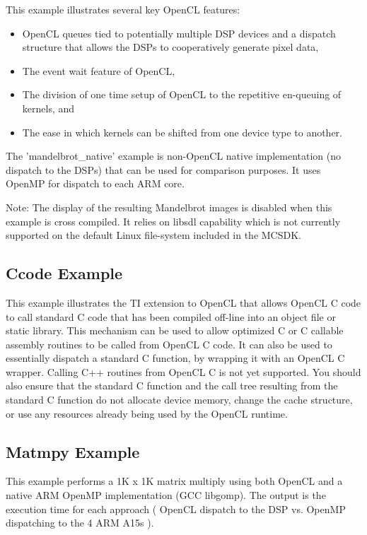 \documentclass[10pt]{article}
\begin{document}
This example illustrates several key OpenCL features:
\begin{itemize}
\item OpenCL queues tied to potentially multiple DSP devices and a 
     dispatch structure that allows the DSPs to cooperatively generate pixel 
     data,
\item The event wait feature of OpenCL,
\item The division of one time setup of OpenCL to the repetitive
     en-queuing of kernels, and
\item The ease in which kernels can be shifted from one device type to another.
\end{itemize}
   

The 'mandelbrot\_native' example is non-OpenCL native implementation (no 
dispatch to the DSPs) that can be used for comparison purposes. It uses OpenMP
for dispatch to each ARM core.

Note: The display of the resulting Mandelbrot images is disabled when this example is cross compiled.  It relies on libsdl capability which is not currently supported on the default Linux file-system included in the MCSDK. 


\subsection{Ccode Example}\label{ccode}
This example illustrates the TI extension to OpenCL that allows OpenCL C code
to call standard C code that has been compiled off-line into an object file or
static library. This mechanism can be used to allow optimized C or C callable
assembly routines to be called from OpenCL C code.  It can also be used to
essentially dispatch a standard C function, by wrapping it with an OpenCL C 
wrapper.  Calling C++ routines from OpenCL C is not yet supported.  You should
also ensure that the standard C function and the call tree resulting from the
standard C function do not allocate device memory, change the cache structure,
or use any resources already being used by the OpenCL runtime. 


\subsection{Matmpy Example}\label{matmpy}
This example performs a 1K x 1K matrix multiply using both OpenCL and a
native ARM OpenMP implementation (GCC libgomp).  The output is the execution
time for each approach ( OpenCL dispatch to the DSP vs. OpenMP dispatching to the 4 ARM A15s ).
\end{document}
